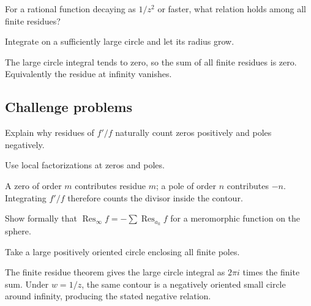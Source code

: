 \begin{exercise}\label{exr:iv10-expand-14}
For a rational function decaying as \(1/z^2\) or faster, what relation holds among all finite residues?
\end{exercise}
\begin{hint}
Integrate on a sufficiently large circle and let its radius grow.
\end{hint}
\begin{solution}
The large circle integral tends to zero, so the sum of all finite residues is zero. Equivalently the residue at infinity vanishes.
\end{solution}

\subsection*{Challenge problems}

\begin{exercise}\label{exr:iv10-expand-15}
Explain why residues of \(f'/f\) naturally count zeros positively and poles negatively.
\end{exercise}
\begin{hint}
Use local factorizations at zeros and poles.
\end{hint}
\begin{solution}
A zero of order \(m\) contributes residue \(m\); a pole of order \(n\) contributes \(-n\). Integrating \(f'/f\) therefore counts the divisor inside the contour.
\end{solution}

\begin{exercise}\label{exr:iv10-expand-16}
Show formally that \(\operatorname{Res}_\infty f=-\sum \operatorname{Res}_{a_k}f\) for a meromorphic function on the sphere.
\end{exercise}
\begin{hint}
Take a large positively oriented circle enclosing all finite poles.
\end{hint}
\begin{solution}
The finite residue theorem gives the large circle integral as \(2\pi i\) times the finite sum. Under \(w=1/z\), the same contour is a negatively oriented small circle around infinity, producing the stated negative relation.
\end{solution}

